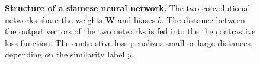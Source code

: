\begin{figure}[t]
\begin{center}
    \end{center}
    \caption[Structure of a siamese neural network]{\textbf{Structure of a siamese neural network.} The two convolutional networks share the weights $\mathbf{W}$ and biases $b$. The distance between the output vectors of the two networks is fed into the the contrastive loss function. The contrastive loss penalizes small or large distances, depending on the similarity label $y$.}
    \label{fig:Siamese}
\end{figure}